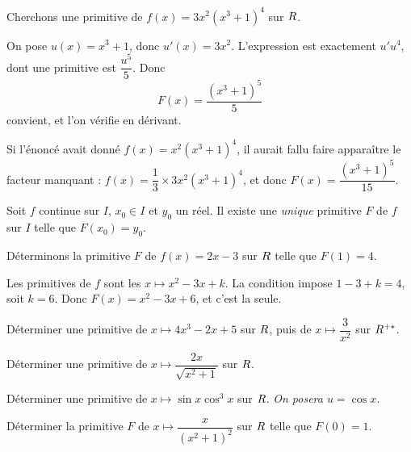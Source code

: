 
\begin{exemple}
Cherchons une primitive de $f(x) = 3x^{2}\left(x^{3}+1\right)^{4}$ sur $R$.

On pose $u(x) = x^{3}+1$, donc $u'(x) = 3x^{2}$. L'expression est exactement
$u'u^{4}$, dont une primitive est $\dfrac{u^{5}}{5}$. Donc
\[
  F(x) = \frac{\left(x^{3}+1\right)^{5}}{5}
\]
convient, et l'on vérifie en dérivant.

\smallskip
Si l'énoncé avait donné $f(x) = x^{2}\left(x^{3}+1\right)^{4}$, il aurait fallu
faire apparaître le facteur manquant :
$f(x) = \dfrac{1}{3}\times 3x^{2}\left(x^{3}+1\right)^{4}$, et donc
$F(x) = \dfrac{\left(x^{3}+1\right)^{5}}{15}$.
\end{exemple}

\begin{propriete}
Soit $f$ continue sur $I$, $x_{0} \in I$ et $y_{0}$ un réel. Il existe une
\emph{unique} primitive $F$ de $f$ sur $I$ telle que $F(x_{0}) = y_{0}$.
\end{propriete}

\begin{exemple}
Déterminons la primitive $F$ de $f(x) = 2x-3$ sur $R$ telle que $F(1) = 4$.

Les primitives de $f$ sont les $x \mapsto x^{2}-3x+k$. La condition impose
$1-3+k = 4$, soit $k = 6$. Donc $F(x) = x^{2}-3x+6$, et c'est la seule.
\end{exemple}

\begin{entrainement}[primitives]
\exo[\niveau{1}] Déterminer une primitive de $x \mapsto 4x^{3}-2x+5$ sur $R$,
puis de $x \mapsto \dfrac{3}{x^{2}}$ sur $R^{+*}$.

\exo[\niveau{2}] Déterminer une primitive de
$x \mapsto \dfrac{2x}{\sqrt{x^{2}+1}}$ sur $R$.

\exo[\niveau{2}] Déterminer une primitive de $x \mapsto \sin x \cos^{3} x$ sur
$R$. \emph{On posera $u = \cos x$.}

\exo[\niveau{3}] Déterminer la primitive $F$ de
$x \mapsto \dfrac{x}{\left(x^{2}+1\right)^{2}}$ sur $R$ telle que $F(0) = 1$.
\end{entrainement}

